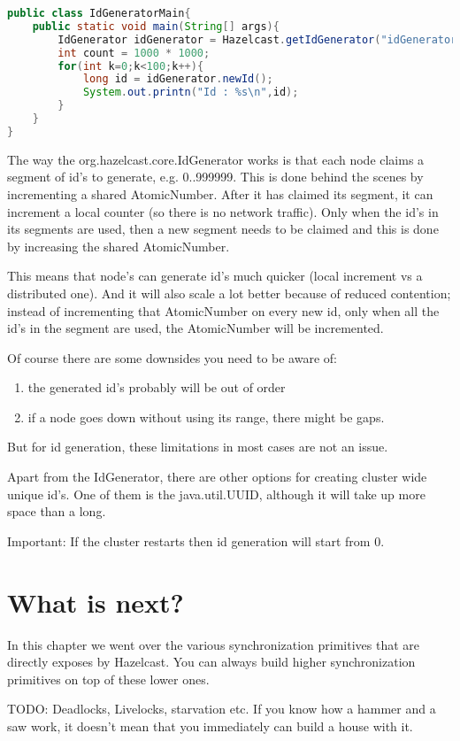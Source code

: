 \begin{lstlisting}[language=java]
public class IdGeneratorMain{
    public static void main(String[] args){
        IdGenerator idGenerator = Hazelcast.getIdGenerator("idGenerator");
        int count = 1000 * 1000;
        for(int k=0;k<100;k++){
            long id = idGenerator.newId();
            System.out.printn("Id : %s\n",id);
        }
    }
}
\end{lstlisting}

The way the org.hazelcast.core.IdGenerator works is that each node claims a segment of id's to generate, e.g. 0..999999. This is done behind the scenes by incrementing a shared AtomicNumber. After it has claimed its segment, it can increment a local counter (so there is no network traffic). Only when the id's in its segments are used, then a new segment needs to be claimed and this is done by increasing the shared AtomicNumber.

This means that node's can generate id's much quicker (local increment vs a distributed one). And it will also scale a lot better because of reduced contention; instead of incrementing that AtomicNumber on every new id, only when all the id's in the segment are used, the AtomicNumber will be incremented.

Of course there are some downsides you need to be aware of:
\begin{enumerate}
\item the generated id's probably will be out of order
\item if a node goes down without using its range, there might be gaps.
\end{enumerate}
But for id generation, these limitations in most cases are not an issue.

Apart from the IdGenerator, there are other options for creating cluster wide unique id's. One of them is the java.util.UUID, although it will take up more space than a long. 

Important: If the cluster restarts then id generation will start from 0.

\section{What is next?}
In this chapter we went over the various synchronization primitives that are directly exposes by Hazelcast. You can always build higher synchronization primitives on top of these lower ones.

TODO: Deadlocks, Livelocks, starvation etc. If you know how a hammer and a saw work, it doesn't mean that you immediately can build a house with it.
